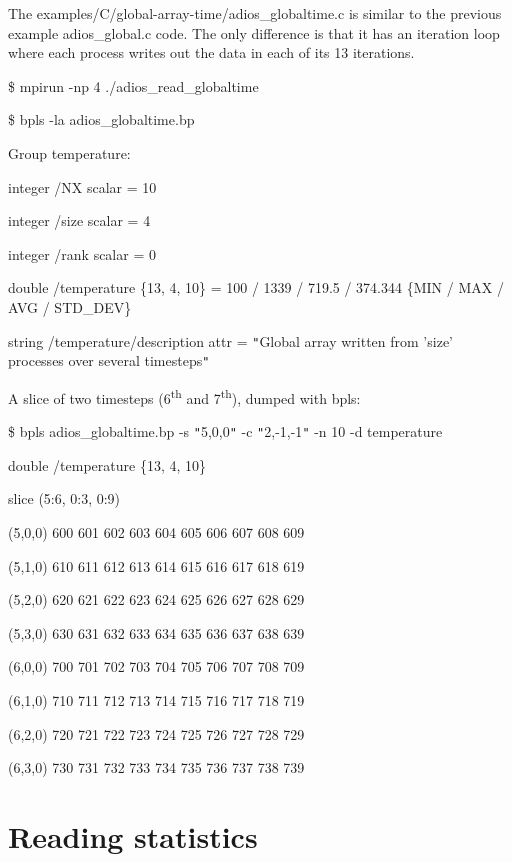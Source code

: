 \baselineskip=13pt
The examples/C/global-array-time/adios\_globaltime.c is similar to the previous 
example adios\_global.c code. The only difference is that it has an iteration loop 
where each process writes out the data in each of its 13 iterations.

\$ mpirun -np 4 ./adios\_read\_globaltime

\$ bpls -la adios\_globaltime.bp 

Group temperature:

\parindent=7pt
integer    /NX                       scalar = 10

integer    /size                     scalar = 4

\parindent=14pt
integer    /rank                     scalar = 0

\parindent=7pt
double     /temperature              \{13, 4, 10\} = 100 / 1339 / 719.5 / 374.344 
 \{MIN / MAX / AVG / STD\_DEV\}

string     /temperature/description  attr   = \texttt{"}Global array written from 
'size' processes over several timesteps\texttt{"}\label{HToc84890304}\label{HToc212016679}\label{HToc212016921}

\parindent=0pt
A slice of two timesteps (6\textsuperscript{th} and 7\textsuperscript{th}), dumped 
with bpls:

\$ bpls adios\_globaltime.bp -s \texttt{"}5,0,0\texttt{"} -c \texttt{"}2,-1,-1\texttt{"} 
-n 10 -d temperature

\parindent=7pt
double     /temperature  \{13, 4, 10\}

\parindent=14pt
slice (5:6, 0:3, 0:9)

\parindent=0pt
(5,0,0)    600 601 602 603 604 605 606 607 608 609

\parindent=14pt
(5,1,0)    610 611 612 613 614 615 616 617 618 619

(5,2,0)    620 621 622 623 624 625 626 627 628 629

\parindent=28pt
(5,3,0)    630 631 632 633 634 635 636 637 638 639

\parindent=14pt
(6,0,0)    700 701 702 703 704 705 706 707 708 709

(6,1,0)    710 711 712 713 714 715 716 717 718 719

\parindent=28pt
(6,2,0)    720 721 722 723 724 725 726 727 728 729

\parindent=14pt
(6,3,0)    730 731 732 733 734 735 736 737 738 739 \label{HToc182553451}

\section{Reading statistics}

